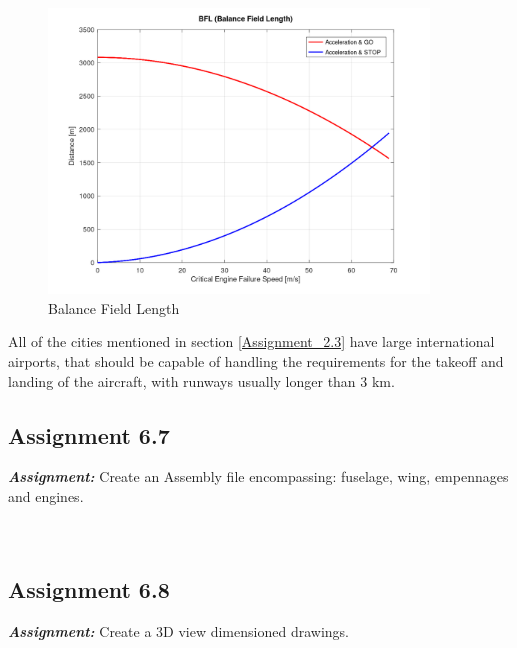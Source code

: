 \documentclass{article}
\begin{document}
\begin{figure}[h!]
    \centering
    \includegraphics[width=0.9\textwidth]{Sources/Plots_and_Pictures/BFL.png}
    \caption{Balance Field Length}
    \label{BFL}
\end{figure}

All of the cities mentioned in section \ref{Assignment_2.3} have large international airports, that should be 
capable of handling the requirements for the takeoff and landing of the aircraft, with runways usually longer than 3 km. \\

\clearpage






\subsection{Assignment 6.7\label{Assignment_6.7}}

\textbf{\textit{Assignment:}} Create an Assembly file encompassing: 
fuselage, wing, empennages and engines. \\ \\ \\ 

\clearpage

\subsection{Assignment 6.8\label{Assignment_6.8}}

\textbf{\textit{Assignment:}} Create a 3D view dimensioned drawings. \\ \\ \\ 
\end{document}
